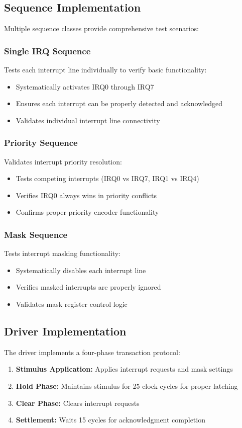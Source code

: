 \documentclass[12pt,a4paper]{article}
\begin{document}
\subsection{Sequence Implementation}
Multiple sequence classes provide comprehensive test scenarios:

\subsubsection{Single IRQ Sequence}
Tests each interrupt line individually to verify basic functionality:
\begin{itemize}
    \item Systematically activates IRQ0 through IRQ7
    \item Ensures each interrupt can be properly detected and acknowledged
    \item Validates individual interrupt line connectivity
\end{itemize}

\subsubsection{Priority Sequence}
Validates interrupt priority resolution:
\begin{itemize}
    \item Tests competing interrupts (IRQ0 vs IRQ7, IRQ1 vs IRQ4)
    \item Verifies IRQ0 always wins in priority conflicts
    \item Confirms proper priority encoder functionality
\end{itemize}

\subsubsection{Mask Sequence}
Tests interrupt masking functionality:
\begin{itemize}
    \item Systematically disables each interrupt line
    \item Verifies masked interrupts are properly ignored
    \item Validates mask register control logic
\end{itemize}

\subsection{Driver Implementation}
The driver implements a four-phase transaction protocol:
\begin{enumerate}
    \item \textbf{Stimulus Application:} Applies interrupt requests and mask settings
    \item \textbf{Hold Phase:} Maintains stimulus for 25 clock cycles for proper latching
    \item \textbf{Clear Phase:} Clears interrupt requests
    \item \textbf{Settlement:} Waits 15 cycles for acknowledgment completion
\end{enumerate}
\end{document}
